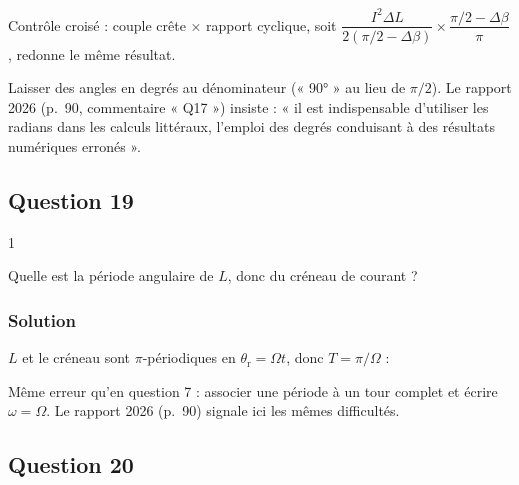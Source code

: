 \documentclass[11pt,a4paper]{article}
\newcommand{\equationajustee}[1]{%
  \sbox{\boiteequation}{$\displaystyle #1$}%
  \ifdim\wd\boiteequation>\linewidth
    \[\resizebox{\linewidth}{!}{\usebox{\boiteequation}}\]%
  \else
    \[#1\]%
  \fi}
\begin{document}
\begin{methode}

Contrôle croisé : couple crête × rapport cyclique, soit \(\dfrac{I^2\Delta L}{2(\pi/2-\Delta\beta)}\times\dfrac{\pi/2-\Delta\beta}{\pi}\), redonne le même résultat.

\end{methode}

\begin{piege}

Laisser des angles en degrés au dénominateur (« 90° » au lieu de \(\pi/2\)). Le rapport 2026 (p.~90, commentaire « Q17 ») insiste : « il est indispensable d'utiliser les radians dans les calculs littéraux, l'emploi des degrés conduisant à des résultats numériques erronés ».

\end{piege}

\hypertarget{question-19}{%
\subsection{Question 19}\label{question-19}}

\begin{indication}{1}

Quelle est la période angulaire de \(L\), donc du créneau de courant ?

\end{indication}

\hypertarget{solution-18}{%
\subsubsection{Solution}\label{solution-18}}

\(L\) et le créneau sont \(\pi\)-périodiques en \(\theta_{\mathrm r}=\Omega t\), donc \(T=\pi/\Omega\) :
\equationajustee{\boxed{\omega=2\Omega}}

\begin{piege}

Même erreur qu'en question 7 : associer une période à un tour complet et écrire \(\omega=\Omega\). Le rapport 2026 (p.~90) signale ici les mêmes difficultés.

\end{piege}

\hypertarget{question-20}{%
\subsection{Question 20}\label{question-20}}
\end{document}
